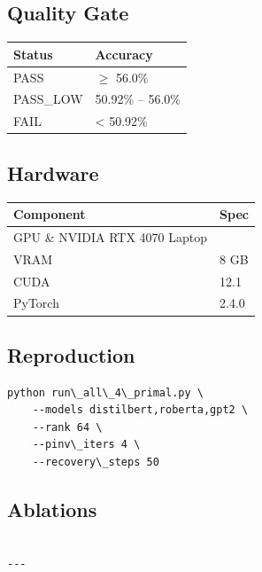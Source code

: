 \subsection{Quality Gate}

\begin{table}[H]
\centering
\small
\begin{tabular}{ll}
\toprule
\textbf{Status} & \textbf{Accuracy} \\
\midrule
PASS & $\ge$ 56.0\% \\
PASS\_LOW & 50.92\% -- 56.0\% \\
FAIL & \textless{} 50.92\% \\
\bottomrule
\end{tabular}
\end{table}

\subsection{Hardware}

\begin{table}[H]
\centering
\small
\begin{tabular}{ll}
\toprule
\textbf{Component} & \textbf{Spec} \\
\midrule
GPU \& NVIDIA RTX 4070 Laptop \\
VRAM & 8 GB \\
CUDA & 12.1 \\
PyTorch & 2.4.0 \\
\bottomrule
\end{tabular}
\end{table}

\subsection{Reproduction}

\begin{lstlisting}
python run\_all\_4\_primal.py \
    --models distilbert,roberta,gpt2 \
    --rank 64 \
    --pinv\_iters 4 \
    --recovery\_steps 50
\end{lstlisting}

\subsection{Ablations}

\begin{lstlisting}

---
\end{lstlisting}